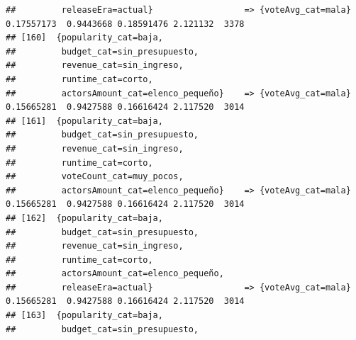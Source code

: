 \documentclass[
]{article}
\begin{document}
\begin{verbatim}
##         releaseEra=actual}                  => {voteAvg_cat=mala}                0.17557173  0.9443668 0.18591476 2.121132  3378
## [160]  {popularity_cat=baja,                                                                                                    
##         budget_cat=sin_presupuesto,                                                                                             
##         revenue_cat=sin_ingreso,                                                                                                
##         runtime_cat=corto,                                                                                                      
##         actorsAmount_cat=elenco_pequeño}    => {voteAvg_cat=mala}                0.15665281  0.9427588 0.16616424 2.117520  3014
## [161]  {popularity_cat=baja,                                                                                                    
##         budget_cat=sin_presupuesto,                                                                                             
##         revenue_cat=sin_ingreso,                                                                                                
##         runtime_cat=corto,                                                                                                      
##         voteCount_cat=muy_pocos,                                                                                                
##         actorsAmount_cat=elenco_pequeño}    => {voteAvg_cat=mala}                0.15665281  0.9427588 0.16616424 2.117520  3014
## [162]  {popularity_cat=baja,                                                                                                    
##         budget_cat=sin_presupuesto,                                                                                             
##         revenue_cat=sin_ingreso,                                                                                                
##         runtime_cat=corto,                                                                                                      
##         actorsAmount_cat=elenco_pequeño,                                                                                        
##         releaseEra=actual}                  => {voteAvg_cat=mala}                0.15665281  0.9427588 0.16616424 2.117520  3014
## [163]  {popularity_cat=baja,                                                                                                    
##         budget_cat=sin_presupuesto,                                                                                             

\end{verbatim}
\end{document}
